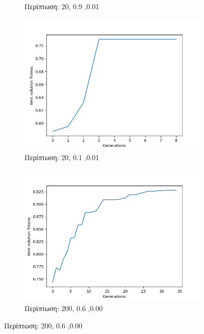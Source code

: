 \documentclass[12pt,a4paper]{article}
\begin{document}
\begin{enumerate}[a)]
\begin{figure}[H]
\begin{subfigure}[h]{0.7\textwidth}
                         \caption*{Περίπτωση: 20, 0.9 ,0.01}
                     \end{subfigure}
                     \begin{subfigure}[h]{0.7\textwidth}
                         \centering
                         \includegraphics[width=\textwidth]{images/5s.png}
                         \caption*{Περίπτωση: 20, 0.1 ,0.01}
                     \end{subfigure}
                     \begin{subfigure}[H]{0.7\textwidth}
                         \centering
                         \includegraphics[width=\textwidth]{images/6s.png}
                         \caption*{Περίπτωση: 200, 0.6 ,0.00}

\end{subfigure}
\end{figure}
\end{enumerate}
\end{document}
